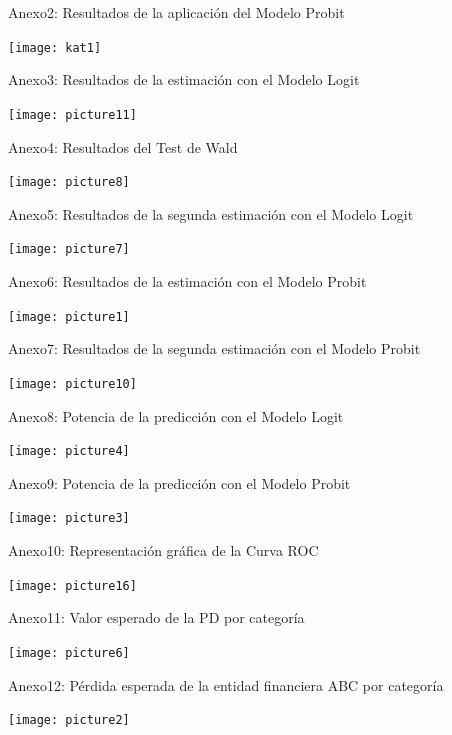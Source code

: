 \documentclass[11pt,fleqn]{book} %
\numberwithin{equation}{section} %
\numberwithin{figure}{section} %
\numberwithin{table}{section} %
\begin{document}
Anexo2: Resultados de la aplicación del Modelo Probit
\begin{center}
\texttt{[image: kat1]}
\end{center}

Anexo3: Resultados de la estimación con el Modelo Logit
\begin{center}
\texttt{[image: picture11]}
\end{center}

Anexo4: Resultados del Test de Wald
\begin{center}
\texttt{[image: picture8]}
\end{center}

Anexo5: Resultados de la segunda estimación con el Modelo Logit \begin{center}
\texttt{[image: picture7]}
\end{center}

\newpage
Anexo6: Resultados de la estimación con el Modelo Probit
\begin{center}
\texttt{[image: picture1]}
\end{center}

Anexo7: Resultados de la segunda estimación con el Modelo Probit
\begin{center}
\texttt{[image: picture10]}
\end{center}

Anexo8: Potencia de la predicción con el Modelo Logit
\begin{center}
\texttt{[image: picture4]}
\end{center}

\newpage
Anexo9: Potencia de la predicción con el Modelo Probit
\begin{center}
\texttt{[image: picture3]}
\end{center}

Anexo10: Representación gráfica de la Curva ROC
\begin{center}
\texttt{[image: picture16]}
\end{center}

Anexo11: Valor esperado de la PD por categoría
\begin{center}
\texttt{[image: picture6]}
\end{center}

Anexo12: Pérdida esperada de la entidad financiera ABC por categoría
\begin{center}
\texttt{[image: picture2]}
\end{center}


\end{document}
